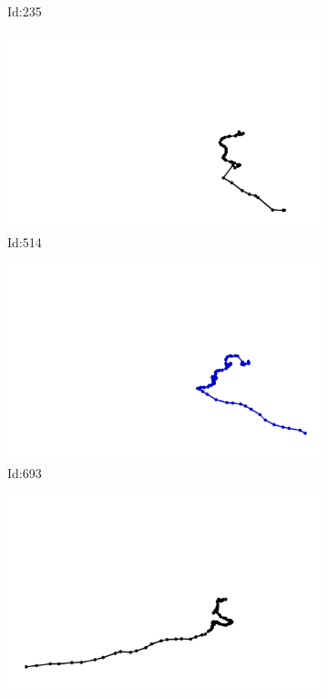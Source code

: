 \documentclass[12pt,twoside]{report}
\begin{document}
\begin{figure}
\begin{subfigure}[b]{0.20\textwidth}
\caption{Id:235}
\end{subfigure}
\begin{subfigure}[b]{0.20\textwidth}
\centering
\includegraphics[width=\textwidth]{../../trajectories/514.png}
\caption{Id:514}
\end{subfigure}
\begin{subfigure}[b]{0.20\textwidth}
\centering
\includegraphics[width=\textwidth]{../../trajectories/693.png}
\caption{Id:693}
\end{subfigure}
\begin{subfigure}[b]{0.20\textwidth}
\centering
\includegraphics[width=\textwidth]{../../trajectories/724.png}

\end{subfigure}
\end{figure}
\end{document}
